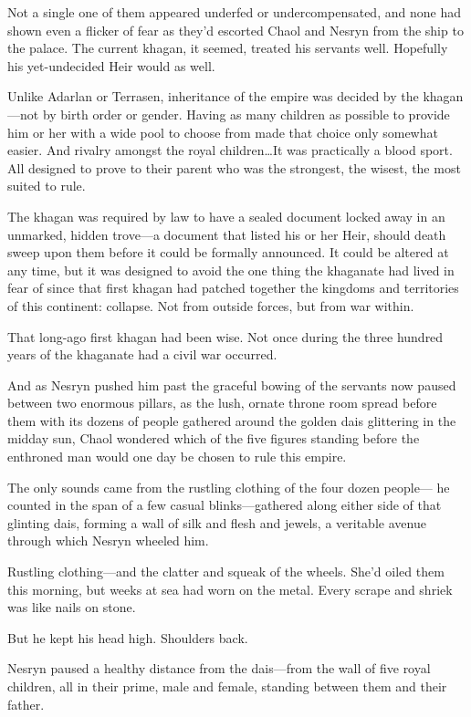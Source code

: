 Not a single one of them appeared underfed or undercompensated, and none had shown even a flicker of fear as they'd escorted Chaol and Nesryn from the ship to the palace. The current khagan, it seemed, treated his servants well. Hopefully his yet-undecided Heir would as well.

Unlike Adarlan or Terrasen, inheritance of the empire was decided by the khagan---not by birth order or gender. Having as many children as possible to provide him or her with a wide pool to choose from made that choice only somewhat easier. And rivalry amongst the royal children\ldots It was practically a blood sport. All designed to prove to their parent who was the strongest, the wisest, the most suited to rule.

The khagan was required by law to have a sealed document locked away in an unmarked, hidden trove---a document that listed his or her Heir, should death sweep upon them before it could be formally announced. It could be altered at any time, but it was designed to avoid the one thing the khaganate had lived in fear of since that first khagan had patched together the kingdoms and territories of this continent: collapse. Not from outside forces, but from war within.

That long-ago first khagan had been wise. Not once during the three hundred years of the khaganate had a civil war occurred.

And as Nesryn pushed him past the graceful bowing of the servants now paused between two enormous pillars, as the lush, ornate throne room spread before them with its dozens of people gathered around the golden dais glittering in the midday sun, Chaol wondered which of the five figures standing before the enthroned man would one day be chosen to rule this empire.

The only sounds came from the rustling clothing of the four dozen people--- he counted in the span of a few casual blinks---gathered along either side of that glinting dais, forming a wall of silk and flesh and jewels, a veritable avenue through which Nesryn wheeled him.

Rustling clothing---and the clatter and squeak of the wheels. She'd oiled them this morning, but weeks at sea had worn on the metal. Every scrape and shriek was like nails on stone.

But he kept his head high. Shoulders back.

Nesryn paused a healthy distance from the dais---from the wall of five royal children, all in their prime, male and female, standing between them and their father.

